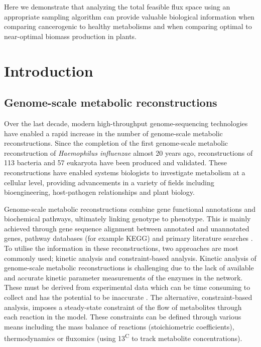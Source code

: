 \documentclass[10pt,letterpaper]{article}
\begin{document}
Here we demonstrate that analyzing the total feasible flux space using an appropriate sampling algorithm can provide valuable biological information when comparing cancerogenic to healthy metabolisms and when comparing optimal to near-optimal biomass production in plants. 


\linenumbers

\section*{Introduction}

\subsection*{Genome-scale metabolic reconstructions}
Over the last decade, modern high-throughput genome-sequencing technologies have enabled a rapid increase in the number of genome-scale metabolic reconstructions. Since the completion of the first genome-scale metabolic reconstruction of \textit{Haemophilus influenzae} almost 20 years ago\cite{Edwards}, reconstructions of 113 bacteria and 57 eukaryota have been produced and validated\cite{Adam}. These reconstructions have enabled systems biologists to investigate metabolism at a cellular level, providing advancements in a variety of fields including bioengineering, host-pathogen relationships and plant biology. 

Genome-scale metabolic reconstructions combine gene functional annotations and biochemical pathways, ultimately linking genotype to phenotype. This is mainly achieved through gene sequence alignment between annotated and unannotated genes, pathway databases (for example KEGG\cite{kegg}) and primary literature searches \cite{Oberhardt}. To utilise the information in these reconstructions, two approaches are most commonly used; kinetic analysis and constraint-based analysis. Kinetic analysis of genome-scale metabolic reconstructions is challenging due to the lack of available and accurate kinetic parameter measurements of the enzymes in the network. These must be derived from experimental data which can be time consuming to collect and has the potential to be inaccurate \cite{Orth}. The alternative, constraint-based analysis, imposes a steady-state constraint of the flow of metabolites through each reaction in the model. These constraints can be defined through various means including the mass balance of reactions (stoichiometric coefficients), thermodynamics or fluxomics (using 13\textsuperscript{C} to track metabolite concentrations)\cite{Ebrahim}.
\end{document}
